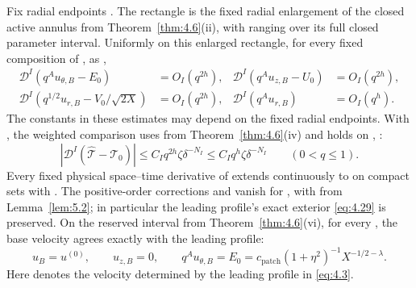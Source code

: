 \begin{proposition}
Fix radial endpoints .
The rectangle  is the fixed radial
enlargement of the closed active annulus
 from Theorem~\ref{thm:4.6}(ii), with
 ranging over its full closed parameter interval. Uniformly on this enlarged
rectangle, for every fixed composition  of
, as
,
\begin{equation}
 \begin{aligned}
  \mathscr D^I(q^Au_{\theta,B}-E_0)&=O_I(q^{2h}),
  &\mathscr D^I(q^Au_{z,B}-U_0)&=O_I(q^{2h}),\\
  \mathscr D^I(q^{1/2}u_{r,B}-V_0/\sqrt{2X})&=O_I(q^{2h}),
  &\mathscr D^I(q^Au_{r,B})&=O_I(q^h).
 \end{aligned}
 \tag{5.42}\label{eq:5.42}
\end{equation}
The constants in these estimates may depend on the fixed radial endpoints. With
, the weighted comparison uses
 from Theorem~\ref{thm:4.6}(iv) and holds on
, :
\begin{equation}
 |\mathscr D^I(\widehat{\mathcal T}-\mathcal T_0)|
 \leq C_Iq^{2h}\zeta\delta^{-N_I}
 \leq C_Iq^h\zeta\delta^{-N_I}
 \qquad(0<q\leq1).
 \tag{5.43}\label{eq:5.43}
\end{equation}
Every fixed physical space--time derivative of
 extends continuously to
 on compact sets with . The positive-order
corrections  and  vanish for
, with  from Lemma~\ref{lem:5.2}; in
particular the leading profile's exact exterior \eqref{eq:4.29} is preserved. On the reserved interval
 from
Theorem~\ref{thm:4.6}(vi), for every , the base velocity agrees
exactly with the leading profile:
\begin{equation}
 u_B=u^{(0)},
 \qquad u_{z,B}=0,
 \qquad q^Au_{\theta,B}=E_0=c_{\mathrm{patch}}(1+\eta^2)^{-1}X^{-1/2-\lambda}.
 \tag{5.44}\label{eq:5.44}
\end{equation}
Here  denotes the velocity determined by the leading profile in
\eqref{eq:4.3}.
\end{proposition}

